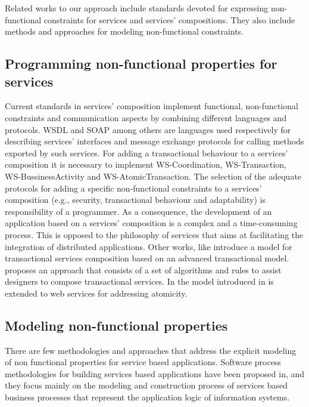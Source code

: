 Related works to our approach include standards devoted for expressing non-functional constraints for services and services' compositions. They also include methods and approaches for modeling non-functional constraints.

\subsection{Programming non-functional properties for services}
Current standards in services' composition implement functional, non-functional constraints and communication aspects by combining different languages and protocols. WSDL and SOAP among others are languages used respectively for describing services' interfaces and message exchange protocols for calling methods exported by such services. For adding a transactional behaviour to a services' composition it is necessary to implement WS-Coordination, WS-Transaction, WS-BussinessActivity and WS-AtomicTransaction. The selection of the adequate protocols for adding a specific non-functional constraints to a services' composition (e.g., security, transactional behaviour and adaptability) is responsibility of a programmer. As a consequence, the development of an application based on a services' composition is a complex and a time-consuming process. This is opposed to the philosophy of services that aims at facilitating the integration of distributed applications. Other works, like \cite{helga2}
introduce a model for transactional services composition based on
an advanced transactional model. \cite{samy} proposes an approach
that consists of a set of algorithms and rules to assist designers
to compose transactional services. In \cite{Vid04} the model
introduced in \cite{schuldt-etal-TODS} is extended to web services
for addressing atomicity.

\subsection{Modeling non-functional properties}
There are few methodologies and approaches that address the explicit modeling  of non functional
properties for service based applications.   Software process methodologies for
building  services based applications have been proposed in\cite{PapazoglouH06,cdl2006,FeuerlichtM05,Ramollari_asurvey}, and they focus mainly on the modeling and construction process of services based business processes that represent the application logic of information systems.

